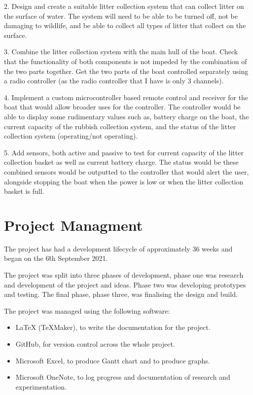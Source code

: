 \documentclass [11pt]{article}
\begin{document}
2.	Design and create a suitable litter collection system that can collect litter on the surface of water. The system will need to be able to be turned off, not be damaging to wildlife, and be able to collect all types of litter that collect on the surface. 

3.	Combine the litter collection system with the main hull of the boat. Check that the functionality of both components is not impeded by the combination of the two parts together. Get the two parts of the boat controlled separately using a radio controller (as the radio controller that I have is only 3 channels).

4.	Implement a custom microcontroller based remote control and receiver for the boat that would allow broader uses for the controller. The controller would be able to display some rudimentary values such as, battery charge on the boat, the current capacity of the rubbish collection system, and the status of the litter collection system (operating/not operating).

5.	Add sensors, both active and passive to test for current capacity of the litter collection basket as well as current battery charge. The status would be these combined sensors would be outputted to the controller that would alert the user, alongside stopping the boat when the power is low or when the litter collection basket is full.  

\section{Project Managment}

The project has had a development lifecycle of approximately 36 weeks and began on the 6\^th September 2021. 

The project was split into three phases of development, phase one was research and development of the project and ideas. Phase two was developing prototypes and testing. The final phase, phase three, was finalising the design and build. 

The project was managed using the following software: 

\begin{itemize}

\item{LaTeX (TeXMaker), to write the documentation for the project.}
\item{GitHub, for version control across the whole project.}
\item{Microsoft Excel, to produce Gantt chart and to produce graphs.}
\item{Microsoft OneNote, to log progress and documentation of research and experimentation.}

\end{itemize}
\end{document}
